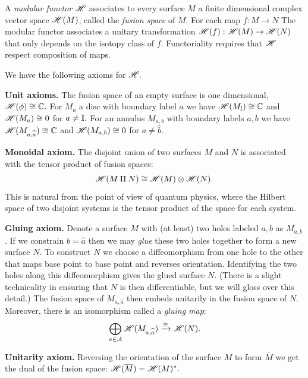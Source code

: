 \documentclass[aps, prl, letterpaper, twocolumn, superscriptaddress, notitlepage, 10pt]{revtex4-1}
\begin{document}
A \emph{modular functor} $\mathscr{H}$ associates to every
surface $M$ a finite dimensional complex
vector space $\mathscr{H}(M)$, called the \emph{fusion space} of $M$.
For each map $f:M\to N$
The modular functor associates a
unitary transformation $\mathscr{H}(f) : \mathscr{H}(M)\to\mathscr{H}(N)$
that only depends on the isotopy class of $f.$
Functoriality requires that $\mathscr{H}$
respect composition of maps.

We have the following axioms for $\mathscr{H}.$

{\bf Unit axioms.}
The fusion space of an empty surface is one dimensional, 
$\mathscr{H}(\phi) \cong \mathbb{C}.$ %
For $M_a$ a disc with boundary label $a$ we have
$\mathscr{H}(M_{\mathbb{I}})\cong \mathbb{C}$ and 
$\mathscr{H}(M_a)\cong 0$ for $a\ne \mathbb{I}.$
For an annulus $M_{a,b}$ with boundary labels
$a, b$ we have
$\mathscr{H}(M_{a,\widehat{a}})\cong \mathbb{C}$ and 
$\mathscr{H}(M_{a,b})\cong 0$ for $a\ne \widehat{b}.$

{\bf Monoidal axiom.}
The disjoint union of two surfaces $M$ and $N$ 
is associated with
the tensor product of fusion spaces:
$$
    \mathscr{H}(M\amalg N) \cong \mathscr{H}(M)\otimes \mathscr{H}(N).
$$
This is natural from the point of view of quantum
physics, where the Hilbert space of two disjoint
systems is the tensor product of the space for
each system.

{\bf Gluing axiom.}
Denote a surface $M$ with (at least) two holes
labeled $a, b$ as $M_{a,b}$. 
If we constrain $b=\widehat{a}$ 
then we may \emph{glue} these two holes together
to form a new surface $N$.
To construct $N$ we choose a diffeomorphism from one
hole to the other that maps base point to base point 
and reverses orientation.
Identifying the two holes along this diffeomorphism
gives the glued surface $N$.
(There is a slight technicality in ensuring that $N$ is
then differentiable, but we will gloss over this detail.)
The fusion space of $M_{a,\widehat{a}}$ then embeds unitarily in the fusion
space of $N$.
Moreover, there is an isomorphism called
a \emph{gluing map}:
$$
    \bigoplus_{a\in\mathcal{A}} \mathscr{H}(M_{a,\widehat{a}}) \xrightarrow{\cong} \mathscr{H}(N).
$$

{\bf Unitarity axiom.}
Reversing the orientation of the surface $M$
to form $\overline{M}$ we get the dual of the fusion space:
$\mathscr{H}(\overline{M})=\mathscr{H}(M)^*.$
\end{document}
